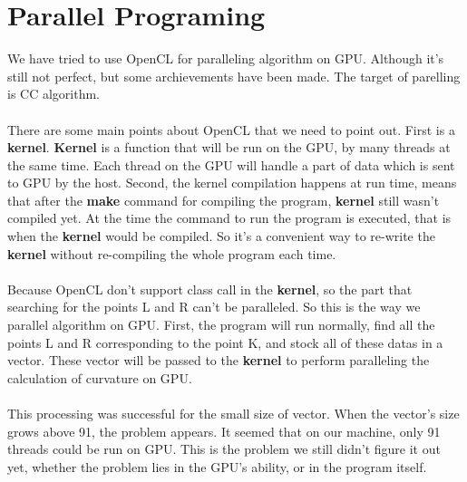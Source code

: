 \section{Parallel Programing}

We have tried to use OpenCL for paralleling algorithm on GPU. Although it's still not perfect, but some archievements have been made. The target of parelling is CC algorithm. 

\paragraph{}
There are some main points about OpenCL that we need to point out. First is a \textbf{kernel}. \textbf{Kernel} is a function that will be run on the GPU, by many threads at the same time. Each thread on the GPU will handle a part of data which is sent to GPU by the host. Second, the kernel compilation happens at run time, means that after the \textbf{make} command for compiling the program, \textbf{kernel} still wasn't compiled yet. At the time the command to run the program is executed, that is when the \textbf{kernel} would be compiled. So it's a convenient way to re-write the \textbf{kernel} without re-compiling the whole program each time. 

\paragraph{}
Because OpenCL don't support class call in the \textbf{kernel}, so the part that searching for the points L and R can't be paralleled. So this is the way we parallel algorithm on GPU. First, the program will run normally, find all the points L and R corresponding to the point K, and stock all of these datas in a vector. These vector will be passed to the \textbf{kernel} to perform paralleling the calculation of curvature on GPU. 

\paragraph{}
This processing was successful for the small size of vector. When the vector's size grows above 91, the problem appears. It seemed that on our machine, only 91 threads could be run on GPU. This is the problem we still didn't figure it out yet, whether the problem lies in the GPU's ability, or in the program itself. 